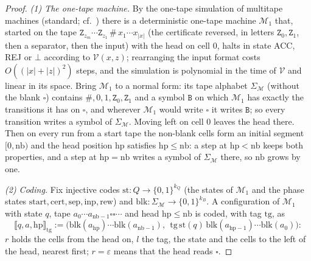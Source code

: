 \begin{proof}
\emph{(1) The one-tape machine.} By the one-tape simulation of multitape machines (standard; cf.\ \citealp{hartmanis1965computational}) there is a deterministic one-tape machine $\mathcal M_1$ that, started on the tape $\mathtt Z_{z_m}\cdots\mathtt Z_{z_1}\,\#\,x_1\cdots x_{\lvert x\rvert}$ (the certificate reversed, in letters $\mathtt Z_0,\mathtt Z_1$, then a separator, then the input) with the head on cell $0$, halts in state ACC, REJ or $\bot$ according to $\mathcal V(x,z)$; rearranging the input format costs $O((\lvert x\rvert+\lvert z\rvert)^2)$ steps, and the simulation is polynomial in the time of $\mathcal V$ and linear in its space. Bring $\mathcal M_1$ to a normal form: its tape alphabet $\Sigma_{\mathcal M}$ (without the blank $\square$) contains $\#,0,1,\mathtt Z_0,\mathtt Z_1$ and a symbol $\mathtt B$ on which $\mathcal M_1$ has exactly the transitions it has on $\square$, and wherever $\mathcal M_1$ would write $\square$ it writes $\mathtt B$; so every transition writes a symbol of $\Sigma_{\mathcal M}$. Moving left on cell $0$ leaves the head there. Then on every run from a start tape the non-blank cells form an initial segment $[0,\mathrm{nb})$ and the head position $\mathrm{hp}$ satisfies $\mathrm{hp}\le\mathrm{nb}$: a step at $\mathrm{hp}<\mathrm{nb}$ keeps both properties, and a step at $\mathrm{hp}=\mathrm{nb}$ writes a symbol of $\Sigma_{\mathcal M}$ there, so $\mathrm{nb}$ grows by one.

\emph{(2) Coding.} Fix injective codes $\mathrm{st}:Q\to\{0,1\}^{k_Q}$ (the states of $\mathcal M_1$ and the phase states $\mathrm{start},\mathrm{cert},\mathrm{sep},\mathrm{inp},\mathrm{rew}$) and $\mathrm{blk}:\Sigma_{\mathcal M}\to\{0,1\}^{k_B}$. A configuration of $\mathcal M_1$ with state $q$, tape $a_0\cdots a_{\mathrm{nb}-1}\square\square\cdots$ and head $\mathrm{hp}\le\mathrm{nb}$ is coded, with tag $\mathrm{tg}$, as
\[
\llbracket q,a,\mathrm{hp}\rrbracket_{\mathrm{tg}}:=\bigl(\mathrm{blk}(a_{\mathrm{hp}})\cdots\mathrm{blk}(a_{\mathrm{nb}-1}),\ \ \mathrm{tg}\,\mathrm{st}(q)\,\mathrm{blk}(a_{\mathrm{hp}-1})\cdots\mathrm{blk}(a_0)\bigr):
\]
$r$ holds the cells from the head on, $l$ the tag, the state and the cells to the left of the head, nearest first; $r=\varepsilon$ means that the head reads $\square$.


\end{proof}
